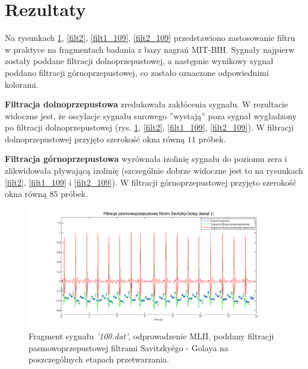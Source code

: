 \documentclass[a4paper]{article}
\begin{document}

\section{Rezultaty}

Na rysunkach \ref{filt1}, \ref{filt2}, \ref{filt1_109}, \ref{filt2_109} przedstawiono zastosowanie filtru w praktyce na fragmentach badania z bazy nagrań MIT-BIH. Sygnały najpierw zostały poddane filtracji dolnoprzepustowej, a następnie wynikowy sygnał poddano filtracji górnoprzepustowej, co zostało oznaczone odpowiednimi kolorami. 

\textbf{Filtracja dolnoprzepustowa} zredukowała zakłócenia sygnału. W rezultacie widoczne jest, że oscylacje sygnału surowego ''wystają'' poza sygnał wygładzony po filtracji dolnoprzepustowej (rys. \ref{filt1}, \ref{filt2}, \ref{filt1_109}, \ref{filt2_109}). W filtracji dolnoprzepustowej przyjęto szerokość okna równą $11$ próbek.

\textbf{Filtracja górnoprzepustowa} wyrównała izolinię sygnału do poziomu zera i zlikwidowała pływającą izolinię (szczególnie dobrze widoczne jest to na rysunkach \ref{filt2}, \ref{filt1_109} i  \ref{filt2_109}). W filtracji górnoprzepustowej przyjęto szerokość okna równą $85$ próbek.

\begin{figure}[H]
\centering
\includegraphics[width=1\textwidth]{100_filt1.png}
\caption{\label{filt1} Fragment sygnału \textit{'100.dat'}, odprowadzenie MLII, poddany filtracji pasmowoprzepustowej filtrami Savitzky\'ego - Golaya na poszczególnych etapach przetwarzania.}
\end{figure}
\end{document}
